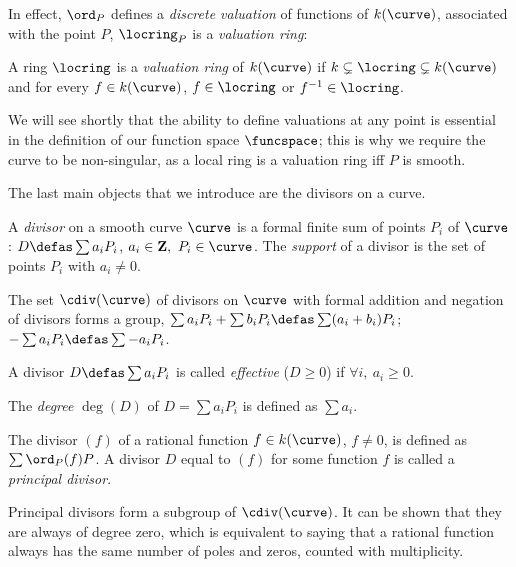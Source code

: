 In effect, $\ord_P$ defines a \emph{discrete valuation} of functions of $k(\curve)$, associated with the point $P$, \ie $\locring_P$ is a \emph{valuation ring}:

\begin{defi}
A ring $\locring$ is a \emph{valuation ring} of $k(\curve)$ if $k \subsetneq \locring \subsetneq k(\curve)$  and for every $f \in k(\curve)$,
$f \in \locring$ or $f^{-1} \in \locring$.
\end{defi}

We will see shortly that the ability to define valuations at any point is essential
in the definition of our function space $\funcspace$; this is why we require the curve to be non-singular, as a local ring is a valuation ring iff $P$ is smooth.

\medskip

The last main objects that we introduce are the divisors on a curve.

\begin{defi}[Divisor]
A \emph{divisor} on a smooth curve $\curve$ is a formal finite sum of points $P_i$ of $\curve$: $D \defas \sum a_iP_i$, $a_i \in \mathbf{Z},~P_i \in \curve$.
The \emph{support} of a divisor is the set of points $P_i$ with $a_i \neq 0$.

\noindent
The set $\cdiv(\curve)$ of divisors on $\curve$ with formal addition and negation of divisors forms a group, \ie $\sum a_iP_i + \sum b_iP_i \defas \sum (a_i+b_i)P_i$;
$-\sum a_iP_i \defas \sum -a_iP_i$.

\noindent
A divisor $D \defas \sum a_iP_i$ is called \emph{effective} ($D \geq 0$) if $\forall i,~a_i \geq 0$.

\noindent
The \emph{degree} $\deg(D)$ of $D = \sum a_iP_i$ is defined as $\sum a_i$.
\end{defi}

\begin{defi}
The divisor $(f)$ of a rational function $f \in k(\curve)$, $f \neq 0$, is defined as $\sum \ord_P(f)P$.
A divisor $D$ equal to $(f)$ for some function $f$ is called a \emph{principal divisor}.
\end{defi}

Principal divisors form a subgroup of $\cdiv(\curve)$. It can be shown that they are always of degree zero, which
is equivalent to saying that a rational function always has the same number of poles and zeros, counted with
multiplicity.

